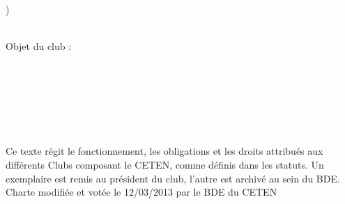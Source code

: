 \documentclass{article} %
\begin{document}
\begin{titlepage}
\begin{todolist}
			\underline{\hspace{5cm}})
		\end{todolist}
		~\\
		Objet du club :\\
		\hspace{\textwidth}\\
		\underline{\hspace{\textwidth}}\\
		\hspace{\textwidth}\\
		\underline{\hspace{\textwidth}}\\
		\hspace{\textwidth}\\
		\underline{\hspace{\textwidth}}\\

		\vfill
		\begin{center}
			{\footnotesize \light Ce texte régit le fonctionnement, les obligations et les
			droits attribués aux différents Clubs composant le CETEN, comme
			définis dans les statuts. Un exemplaire est remis au président du
			club, l’autre est archivé au sein du BDE. \\
			Charte modifiée et votée le 12/03/2013 par le BDE du CETEN}
		\end{center}
	\end{titlepage}


\end{document}
